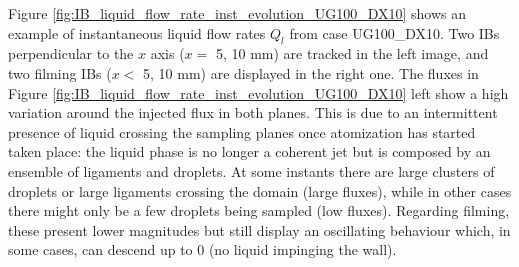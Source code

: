 Figure \ref{fig:IB_liquid_flow_rate_inst_evolution_UG100_DX10} shows an example of instantaneous liquid flow rates $Q_l$ from case UG100\_DX10. Two IBs perpendicular to the $x$ axis ($x = $ 5, 10 mm) are tracked in the left image, and two filming IBs ($x < $ 5, 10 mm) are displayed in the right one. The fluxes in Figure \ref{fig:IB_liquid_flow_rate_inst_evolution_UG100_DX10} left show a high variation around the injected flux in both planes. This is due to an intermittent presence of liquid crossing the sampling planes once atomization has started taken place: the liquid phase is no longer a coherent jet but is composed by an ensemble of ligaments and droplets. At some instants there are large clusters of droplets or large ligaments crossing the domain (large fluxes), while in other cases there might only be a few droplets being sampled (low fluxes). Regarding filming, these present lower magnitudes but still display an oscillating behaviour which, in some cases, can descend up to $0$ (no liquid impinging the wall).


